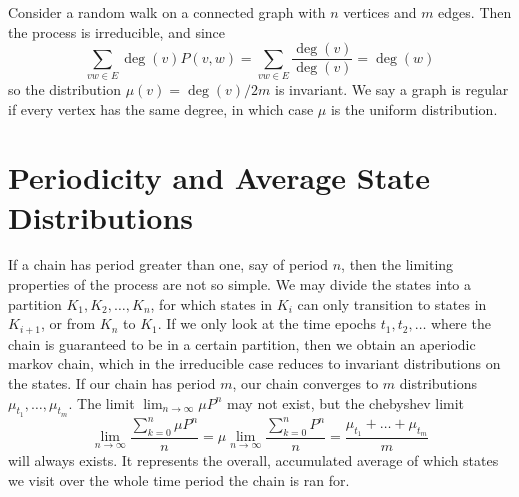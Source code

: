 \begin{example}
    Consider a random walk on a connected graph with $n$ vertices and $m$ edges. Then the process is irreducible, and since
    \[ \sum_{vw \in E} \deg(v) P(v,w) = \sum_{vw \in E} \frac{\deg(v)}{\deg(v)} = \deg(w) \]
    so the distribution $\mu(v) = \deg(v)/2m$ is invariant. We say a graph is regular if every vertex has the same degree, in which case $\mu$ is the uniform distribution.
\end{example}

\section{Periodicity and Average State Distributions}

If a chain has period greater than one, say of period $n$, then the limiting properties of the process are not so simple. We may divide the states into a partition $K_1, K_2, \dots, K_n$, for which states in $K_i$ can only transition to states in $K_{i+1}$, or from $K_n$ to $K_1$. If we only look at the time epochs $t_1, t_2, \dots$ where the chain is guaranteed to be in a certain partition, then we obtain an aperiodic markov chain, which in the irreducible case reduces to invariant distributions on the states. If our chain has period $m$, our chain converges to $m$ distributions $\mu_{t_1}, \dots, \mu_{t_m}$. The limit $\lim_{n \to \infty} \mu P^n$ may not exist, but the chebyshev limit
%
\[ \lim_{n \to \infty} \frac{\sum_{k = 0}^n \mu P^n}{n} = \mu \lim_{n \to \infty} \frac{\sum_{k = 0}^n P^n}{n} = \frac{\mu_{t_1} + \dots + \mu_{t_m}}{m} \]
%
will always exists. It represents the overall, accumulated average of which states we visit over the whole time period the chain is ran for.

